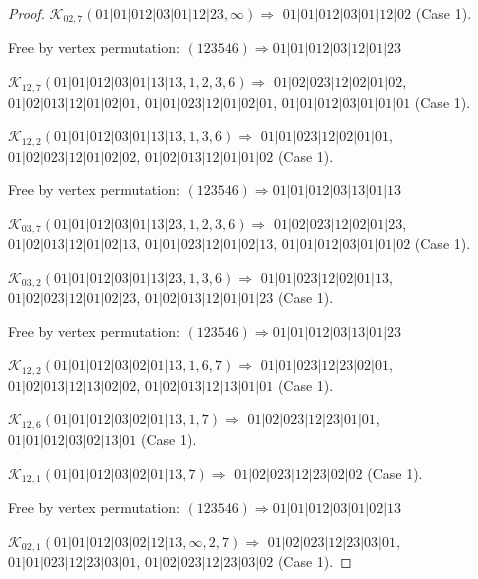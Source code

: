 \documentclass[12pt]{article}
\theoremstyle{plain}
\theoremstyle{definition}
\theoremstyle{remark}
\newcommand{\fancy}[1]{\mathcal{#1}}
\def\K{\fancy{K}}
\begin{document}
\begin{proof}
	$\K_{02,7}(01|01|012|03|01|12|23,\infty)\Rightarrow $ $01|01|012|03|01|12|02$ (Case 1).
	
	
	
	Free by vertex permutation: $(1 2 3 5 4 6)\Rightarrow 01|01|012|03|12|01|23$
	
	
	
	\bigskip
	
	$\K_{12,7}(01|01|012|03|01|13|13,1, 2, 3, 6)\Rightarrow $ $01|02|023|12|02|01|02$, $01|02|013|12|01|02|01$, $01|01|023|12|01|02|01$, $01|01|012|03|01|01|01$ (Case 1).
	
	$\K_{12,2}(01|01|012|03|01|13|13,1, 3, 6)\Rightarrow $ $01|01|023|12|02|01|01$, $01|02|023|12|01|02|02$, $01|02|013|12|01|01|02$ (Case 1).
	
	
	
	Free by vertex permutation: $(1 2 3 5 4 6)\Rightarrow 01|01|012|03|13|01|13$
	
	
	
	\bigskip
	
	$\K_{03,7}(01|01|012|03|01|13|23,1, 2, 3, 6)\Rightarrow $ $01|02|023|12|02|01|23$, $01|02|013|12|01|02|13$, $01|01|023|12|01|02|13$, $01|01|012|03|01|01|02$ (Case 1).
	
	$\K_{03,2}(01|01|012|03|01|13|23,1, 3, 6)\Rightarrow $ $01|01|023|12|02|01|13$, $01|02|023|12|01|02|23$, $01|02|013|12|01|01|23$ (Case 1).
	
	
	
	Free by vertex permutation: $(1 2 3 5 4 6)\Rightarrow 01|01|012|03|13|01|23$
	
	
	
	\bigskip
	
	$\K_{12,2}(01|01|012|03|02|01|13,1, 6, 7)\Rightarrow $ $01|01|023|12|23|02|01$, $01|02|013|12|13|02|02$, $01|02|013|12|13|01|01$ (Case 1).
	
	$\K_{12,6}(01|01|012|03|02|01|13,1, 7)\Rightarrow $ $01|02|023|12|23|01|01$, $01|01|012|03|02|13|01$ (Case 1).
	
	$\K_{12,1}(01|01|012|03|02|01|13,7)\Rightarrow $ $01|02|023|12|23|02|02$ (Case 1).
	
	
	
	Free by vertex permutation: $(1 2 3 5 4 6)\Rightarrow 01|01|012|03|01|02|13$
	
	
	
	\bigskip
	
	$\K_{02,1}(01|01|012|03|02|12|13,\infty,2, 7)\Rightarrow $ $01|02|023|12|23|03|01$, $01|01|023|12|23|03|01$, $01|02|023|12|23|03|02$ (Case 1).
	

\end{proof}
\end{document}
